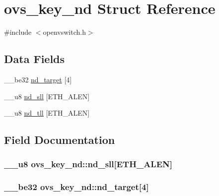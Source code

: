 \hypertarget{structovs__key__nd}{}\section{ovs\+\_\+key\+\_\+nd Struct Reference}
\label{structovs__key__nd}


{\ttfamily \#include $<$openvswitch.\+h$>$}

\subsection*{Data Fields}
\begin{DoxyCompactItemize}
\item 
\+\_\+\+\_\+be32 \hyperlink{structovs__key__nd_ab37fa98a8363f7c9600780df6b88a2e7}{nd\+\_\+target} \mbox{[}4\mbox{]}
\item 
\+\_\+\+\_\+u8 \hyperlink{structovs__key__nd_ad127c3fcbfc08dbf63e762c387f57b12}{nd\+\_\+sll} \mbox{[}E\+T\+H\+\_\+\+A\+L\+E\+N\mbox{]}
\item 
\+\_\+\+\_\+u8 \hyperlink{structovs__key__nd_a66559abec4bf299ada50794d2f43f30d}{nd\+\_\+tll} \mbox{[}E\+T\+H\+\_\+\+A\+L\+E\+N\mbox{]}
\end{DoxyCompactItemize}


\subsection{Field Documentation}
\hypertarget{structovs__key__nd_ad127c3fcbfc08dbf63e762c387f57b12}{}
\subsubsection[{nd\+\_\+sll}]{\setlength{\rightskip}{0pt plus 5cm}\+\_\+\+\_\+u8 ovs\+\_\+key\+\_\+nd\+::nd\+\_\+sll\mbox{[}E\+T\+H\+\_\+\+A\+L\+E\+N\mbox{]}}\label{structovs__key__nd_ad127c3fcbfc08dbf63e762c387f57b12}
\hypertarget{structovs__key__nd_ab37fa98a8363f7c9600780df6b88a2e7}{}
\subsubsection[{nd\+\_\+target}]{\setlength{\rightskip}{0pt plus 5cm}\+\_\+\+\_\+be32 ovs\+\_\+key\+\_\+nd\+::nd\+\_\+target\mbox{[}4\mbox{]}}\label{structovs__key__nd_ab37fa98a8363f7c9600780df6b88a2e7}
\hypertarget{structovs__key__nd_a66559abec4bf299ada50794d2f43f30d}{}
